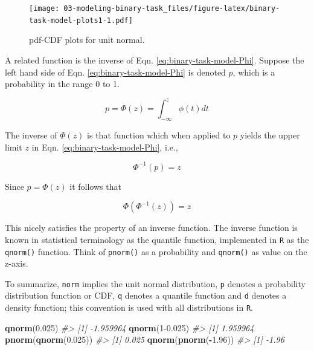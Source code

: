 \documentclass[
]{book}
\newenvironment{Shaded}{\begin{snugshade}}{\end{snugshade}}
\newcommand{\CommentTok}[1]{\textcolor[rgb]{0.56,0.35,0.01}{\textit{#1}}}
\newcommand{\DecValTok}[1]{\textcolor[rgb]{0.00,0.00,0.81}{#1}}
\newcommand{\FloatTok}[1]{\textcolor[rgb]{0.00,0.00,0.81}{#1}}
\newcommand{\KeywordTok}[1]{\textcolor[rgb]{0.13,0.29,0.53}{\textbf{#1}}}
\newcommand{\NormalTok}[1]{#1}
\newcommand{\OperatorTok}[1]{\textcolor[rgb]{0.81,0.36,0.00}{\textbf{#1}}}
\begin{document}
\begin{figure}
\centering
\texttt{[image: 03-modeling-binary-task\_files/figure-latex/binary-task-model-plots1-1.pdf]}
\caption{\label{fig:binary-task-model-plots1}pdf-CDF plots for unit normal.}
\end{figure}

A related function is the inverse of Eqn. \eqref{eq:binary-task-model-Phi}. Suppose the left hand side of Eqn. \eqref{eq:binary-task-model-Phi} is denoted \(p\), which is a probability in the range 0 to 1.

\begin{equation} 
p=\Phi\left ( z \right )=\int_{-\infty }^{z}\phi(t)dt
\label{eq:binary-task-model-Phi2}
\end{equation}

The inverse of \(\Phi(z)\) is that function which when applied to \(p\) yields the upper limit \(z\) in Eqn. \eqref{eq:binary-task-model-Phi}, i.e.,

\begin{equation} 
\Phi^{-1}(p) = z
\label{eq:binary-task-model-PhiInvDef}
\end{equation}

Since \(p=\Phi(z)\) it follows that

\begin{equation} 
\Phi(\Phi^{-1}(z))=z
\label{eq:binary-task-model-PhiInvDef2}
\end{equation}

This nicely satisfies the property of an inverse function. The inverse function is known in statistical terminology as the quantile function, implemented in \texttt{R} as the \texttt{qnorm()} function. Think of \texttt{pnorm()} as a probability and \texttt{qnorm()} as value on the z-axis.

To summarize, \texttt{norm} implies the unit normal distribution, \texttt{p} denotes a probability distribution function or CDF, \texttt{q} denotes a quantile function and \texttt{d} denotes a density function; this convention is used with all distributions in \texttt{R}.

\begin{Shaded}
\begin{Highlighting}[]
\KeywordTok{qnorm}\NormalTok{(}\FloatTok{0.025}\NormalTok{)}
\CommentTok{#> [1] -1.959964}
\KeywordTok{qnorm}\NormalTok{(}\DecValTok{1}\FloatTok{-0.025}\NormalTok{)}
\CommentTok{#> [1] 1.959964}
\KeywordTok{pnorm}\NormalTok{(}\KeywordTok{qnorm}\NormalTok{(}\FloatTok{0.025}\NormalTok{))}
\CommentTok{#> [1] 0.025}
\KeywordTok{qnorm}\NormalTok{(}\KeywordTok{pnorm}\NormalTok{(}\OperatorTok{-}\FloatTok{1.96}\NormalTok{))}
\CommentTok{#> [1] -1.96}
\end{Highlighting}
\end{Shaded}
\end{document}

